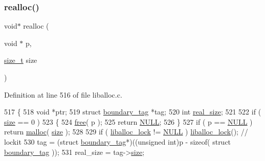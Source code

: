 \subsubsection{\texorpdfstring{realloc()}{realloc()}}
{\footnotesize\ttfamily void$\ast$ realloc (\begin{DoxyParamCaption}\item[{void $\ast$}]{p,  }\item[{\hyperlink{a00038_a7c94ea6f8948649f8d181ae55911eeaf_a7c94ea6f8948649f8d181ae55911eeaf}{size\+\_\+t}}]{size }\end{DoxyParamCaption})}



Definition at line 516 of file liballoc.\+c.


\begin{DoxyCode}
517 \{
518     \textcolor{keywordtype}{void} *ptr;
519     \textcolor{keyword}{struct }\hyperlink{a00126}{boundary\_tag} *tag;
520     \textcolor{keywordtype}{int} \hyperlink{a00126_ad22b1c69bdce419783ac165f7f354245_ad22b1c69bdce419783ac165f7f354245}{real\_size};
521     
522     \textcolor{keywordflow}{if} ( \hyperlink{a00126_a29b056a39f6022d32468e7913e6df936_a29b056a39f6022d32468e7913e6df936}{size} == 0 )
523     \{
524         \hyperlink{a00035_afbedc913aa4651b3c3b4b3aecd9b4711_afbedc913aa4651b3c3b4b3aecd9b4711}{free}( p );
525         \textcolor{keywordflow}{return} \hyperlink{a00038_a070d2ce7b6bb7e5c05602aa8c308d0c4_a070d2ce7b6bb7e5c05602aa8c308d0c4}{NULL};
526     \}
527     \textcolor{keywordflow}{if} ( p == \hyperlink{a00038_a070d2ce7b6bb7e5c05602aa8c308d0c4_a070d2ce7b6bb7e5c05602aa8c308d0c4}{NULL} ) \textcolor{keywordflow}{return} \hyperlink{a00035_a7ac38fce3243a7dcf448301ee9ffd392_a7ac38fce3243a7dcf448301ee9ffd392}{malloc}( \hyperlink{a00126_a29b056a39f6022d32468e7913e6df936_a29b056a39f6022d32468e7913e6df936}{size} );
528 
529     \textcolor{keywordflow}{if} ( \hyperlink{a00038_a8b5670e4594b0b6f8be78fe17f0c3b53_a8b5670e4594b0b6f8be78fe17f0c3b53}{liballoc\_lock} != \hyperlink{a00038_a070d2ce7b6bb7e5c05602aa8c308d0c4_a070d2ce7b6bb7e5c05602aa8c308d0c4}{NULL} ) \hyperlink{a00038_a8b5670e4594b0b6f8be78fe17f0c3b53_a8b5670e4594b0b6f8be78fe17f0c3b53}{liballoc\_lock}();     \textcolor{comment}{// lockit}
530         tag = (\textcolor{keyword}{struct }\hyperlink{a00126}{boundary\_tag}*)((\textcolor{keywordtype}{unsigned} \textcolor{keywordtype}{int})p - \textcolor{keyword}{sizeof}( \textcolor{keyword}{struct }
      \hyperlink{a00126}{boundary\_tag} ));
531         real\_size = tag->\hyperlink{a00126_a29b056a39f6022d32468e7913e6df936_a29b056a39f6022d32468e7913e6df936}{size};

\end{DoxyCode}
